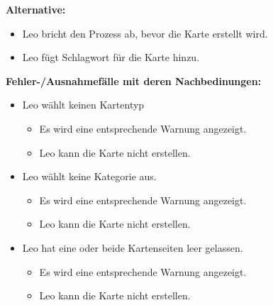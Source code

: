 \documentclass[fontsize=12pt,paper=a4,twoside]{scrartcl}
\begin{document}
\textbf{Alternative:}
\begin{itemize}
	\item Leo bricht den Prozess ab, bevor die Karte erstellt wird.
	\item Leo fügt Schlagwort für die Karte hinzu.
\end{itemize}
\textbf{Fehler-/Ausnahmefälle mit deren Nachbedinungen:}
\begin{itemize}
	\item Leo wählt keinen Kartentyp
	\begin{itemize}
		\item Es wird eine entsprechende Warnung angezeigt.
		\item Leo kann die Karte nicht erstellen.
	\end{itemize}
	\item Leo wählt keine Kategorie aus.
	\begin{itemize}
		\item Es wird eine entsprechende Warnung angezeigt.
		\item Leo kann die Karte nicht erstellen.
	\end{itemize}
	\item Leo hat eine oder beide Kartenseiten leer gelassen.
	\begin{itemize}
		\item Es wird eine entsprechende Warnung angezeigt.
		\item Leo kann die Karte nicht erstellen.
	\end{itemize}
\end{itemize}
\end{document}
